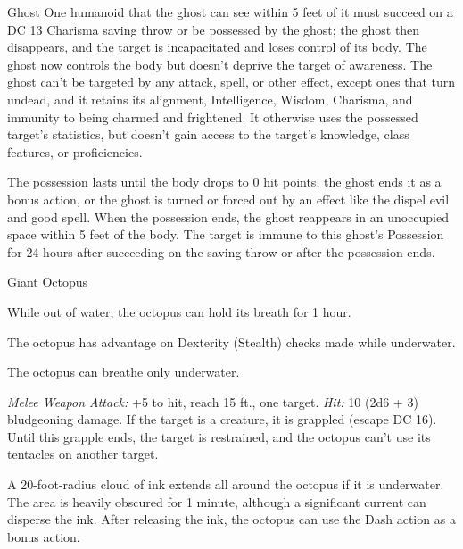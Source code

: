 \documentclass[10pt,a4paper,twoside,bg=none,twocolumn,openany,nodeprecatedcode]{dndbook}
\begin{document}
\begin{DndMonster}[float=t]{Ghost}
One humanoid that the ghost can see within 5 feet of it must succeed on a DC 13 Charisma saving throw or be possessed by the ghost; the ghost then disappears, and the target is incapacitated and loses control of its body. The ghost now controls the body but doesn't deprive the target of awareness. The ghost can't be targeted by any attack, spell, or other effect, except ones that turn undead, and it retains its alignment, Intelligence, Wisdom, Charisma, and immunity to being charmed and frightened. It otherwise uses the possessed target's statistics, but doesn't gain access to the target's knowledge, class features, or proficiencies.

The possession lasts until the body drops to 0 hit points, the ghost ends it as a bonus action, or the ghost is turned or forced out by an effect like the dispel evil and good spell. When the possession ends, the ghost reappears in an unoccupied space within 5 feet of the body. The target is immune to this ghost's Possession for 24 hours after succeeding on the saving throw or after the possession ends.

\end{DndMonster}



\begin{DndMonster}[float=t]{Giant Octopus}
\DndMonsterBasics[
armor-class = {11},
hit-points = {\DndDice{8d10 + 8}},
speed = {10 ft., swim 60 ft.}
]
\DndMonsterAbilityScores[
 str = 17,
 dex = 13,
 con = 13,
 int = 4,
 wis = 10,
 cha = 4
]
\DndMonsterDetails[
skills = {Perception +4, Stealth +5},
senses = {darkvision 60 ft., passive perception 14},
challenge = 1,
]
While out of water, the octopus can hold its breath for 1 hour.

The octopus has advantage on Dexterity (Stealth) checks made while underwater.

The octopus can breathe only underwater.

\par
{}
\textsl{Melee Weapon Attack:} +5 to hit, reach 15 ft., one target. \textsl{Hit:} 10 (2d6 + 3) bludgeoning damage. If the target is a creature, it is grappled (escape DC 16). Until this grapple ends, the target is restrained, and the octopus can't use its tentacles on another target.

A 20-foot-radius cloud of ink extends all around the octopus if it is underwater. The area is heavily obscured for 1 minute, although a significant current can disperse the ink. After releasing the ink, the octopus can use the Dash action as a bonus action.

\end{DndMonster}
\end{document}
